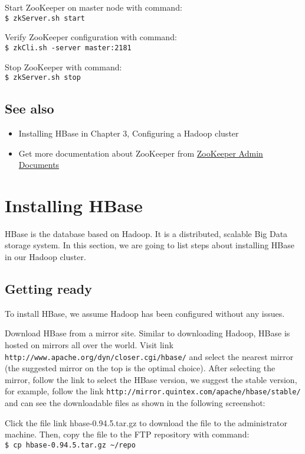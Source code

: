 Start ZooKeeper on master node with command: \\
\verb|$ zkServer.sh start|

Verify ZooKeeper configuration with command: \\
\verb|$ zkCli.sh -server master:2181|

Stop ZooKeeper with command: \\
\verb|$ zkServer.sh stop|

\subsection*{See also}
\begin{itemize}
  \item Installing HBase in Chapter 3, Configuring a Hadoop cluster
  \item Get more documentation about ZooKeeper from \href{http://zookeeper.apache.org/doc/r3.4.5/zookeeperAdmin.html}{ZooKeeper Admin Documents}
\end{itemize}

\section{Installing HBase}
HBase is the database based on Hadoop. It is a distributed, scalable Big Data storage system. In this section, we are going to list steps about installing HBase in our Hadoop cluster.

\subsection*{Getting ready}
To install HBase, we assume Hadoop has been configured without any issues.

Download HBase from a mirror site. Similar to downloading Hadoop, HBase is hosted on mirrors all over the world. Visit link \verb|http://www.apache.org/dyn/closer.cgi/hbase/| and select the nearest mirror (the suggested mirror on the top is the optimal choice).  After selecting the mirror, follow the link to select the HBase version, we suggest the stable version, for example, follow the link \verb|http://mirror.quintex.com/apache/hbase/stable/| and can see the downloadable files as shown in the following screenshot:

Click the file link hbase-0.94.5.tar.gz to download the file to the administrator machine. Then, copy the file to the FTP repository with command: \\
\verb|$ cp hbase-0.94.5.tar.gz ~/repo|

